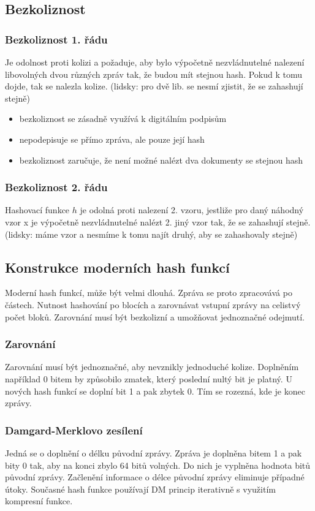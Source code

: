 \documentclass{szzclass}
\begin{document}
\subsection{Bezkoliznost}
\subsubsection{Bezkoliznost 1. řádu}
Je odolnost proti kolizi a požaduje, aby bylo výpočetně nezvládnutelné nalezení libovolných dvou různých zpráv tak, že budou mít stejnou hash.
Pokud k tomu dojde, tak se nalezla kolize. (lidsky: pro dvě lib. se nesmí zjistit, že se zahashují stejně)
\begin{itemize}
    \item bezkoliznost se zásadně využívá k digitálním podpisům
    \item nepodepisuje se přímo zpráva, ale pouze její hash
    \item bezkoliznost zaručuje, že není možné nalézt dva dokumenty se stejnou hash
\end{itemize}
\subsubsection{Bezkoliznost 2. řádu}
Hashovací funkce $h$ je odolná proti nalezení 2. vzoru, jestliže pro daný náhodný vzor x je výpočetně nezvládnutelné nalézt 2. jiný vzor tak, že se
zahashují stejně. (lidsky: máme vzor a nesmíme k tomu najít druhý, aby se zahashovaly stejně)
\subsection{Konstrukce moderních hash funkcí}
Moderní hash funkcí, může být velmi dlouhá. Zpráva se proto zpracovává po částech. Nutnost hashování po blocích a zarovnávat vstupní zprávy na celistvý počet bloků.
Zarovnání musí být bezkolizní a umožňovat jednoznačné odejmutí.
\subsubsection{Zarovnání}
Zarovnání musí být jednoznačné, aby nevznikly jednoduché kolize. Doplněním například 0 bitem by způsobilo zmatek, který poslední nultý bit je platný.
U nových hash funkcí se doplní bit 1 a pak zbytek 0. Tím se rozezná, kde je konec zprávy.
\subsubsection{Damgard-Merklovo zesílení}
Jedná se o doplnění o délku původní zprávy. Zpráva je doplněna bitem 1 a pak bity 0 tak, aby na konci zbylo 64 bitů volných. Do nich je vyplněna hodnota
 bitů původní zprávy. Začlenění informace o délce původní zprávy eliminuje případné útoky. Současné hash funkce používají DM princip iterativně s využitím kompresní funkce.
\end{document}
